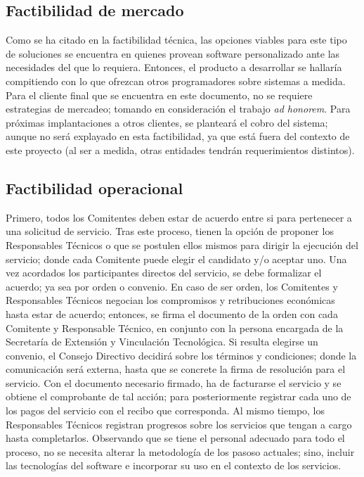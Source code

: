 \subsection{Factibilidad de mercado}
\normalsize{ \indent
Como se ha citado en la factibilidad t\'ecnica, las opciones
viables para este tipo de soluciones se encuentra en quienes
provean software personalizado ante las necesidades del que
lo requiera. Entonces, el producto a desarrollar se hallar\'ia
compitiendo con lo que ofrezcan otros programadores sobre
sistemas a medida.
}
\newline
\normalsize{ \indent
Para el cliente final que se encuentra en este documento,
no se requiere estrategias de mercadeo; tomando en
consideraci\'on el trabajo \textit{ad honorem}. Para
pr\'oximas implantaciones a otros clientes, se plantear\'a
el cobro del sistema; aunque no ser\'a explayado en esta
factibilidad, ya que est\'a fuera del contexto de este
proyecto (al ser a medida, otras entidades tendr\'an
requerimientos distintos).
}
\subsection{Factibilidad operacional}
\normalsize{ \indent
Primero, todos los Comitentes deben estar de acuerdo entre
si para pertenecer a una solicitud de servicio. Tras
este proceso, tienen la opci\'on de proponer los
Responsables T\'ecnicos o que se postulen ellos mismos
para dirigir la ejecuci\'on del servicio; donde cada
Comitente puede elegir el candidato y/o aceptar uno.
}
\newline
\normalsize{ \indent
Una vez acordados los participantes directos del servicio,
se debe formalizar el acuerdo; ya sea por orden o convenio.
En caso de ser orden, los Comitentes y Responsables
T\'ecnicos negocian los compromisos y retribuciones
econ\'omicas hasta estar de acuerdo; entonces, se firma
el documento de la orden con cada Comitente y Responsable
T\'ecnico, en conjunto con la persona encargada de la
Secretar\'ia de Extensi\'on y Vinculaci\'on Tecnol\'ogica.
Si resulta elegirse un convenio, el Consejo Directivo
decidir\'a sobre los t\'erminos y condiciones; donde
la comunicaci\'on ser\'a externa, hasta que se concrete
la firma de resoluci\'on para el servicio.
}
\newline
\normalsize{ \indent
Con el documento necesario firmado, ha de facturarse el
servicio y se obtiene el comprobante de tal acci\'on;
para posteriormente registrar cada uno de los pagos del
servicio con el recibo que corresponda. Al mismo tiempo,
los Responsables T\'ecnicos registran progresos sobre
los servicios que tengan a cargo hasta completarlos.
}
\newline
\normalsize{ \indent
Observando que se tiene el personal adecuado para todo el
proceso, no se necesita alterar la metodolog\'ia de
los pasoso actuales; sino, incluir las tecnolog\'ias
del software e incorporar su uso en el contexto de los
servicios.
}
